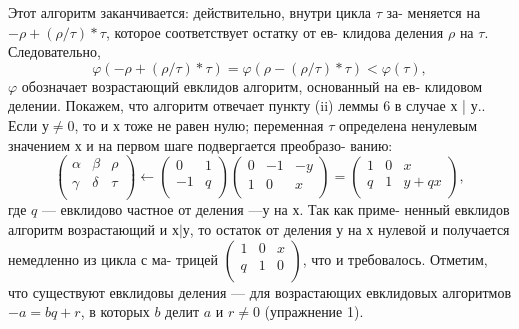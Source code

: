 \documentclass{mai_book}
\begin{document}
\begin{myproof}
Этот алгоритм заканчивается: действительно, внутри цикла $\tau$ за- \linebreak меняется на $ -\rho + (\rho / \tau) * \tau$, которое соответствует остатку от ев- \linebreak клидова деления $\rho$ на $\tau$. Следовательно, 
$$\varphi(-\rho + (\rho / \tau) * \tau) = \varphi (\rho - (\rho / \tau) * \tau) < \varphi(\tau),$$
$\varphi$ обозначает возрастающий евклидов алгоритм, основанный на ев- \linebreak клидовом делении.  
Покажем, что алгоритм отвечает пункту (ii) леммы 6 в случае х | у.. Если $у \ne 0$, то и $х$ тоже не равен нулю; переменная $\tau$ определена \linebreak ненулевым значением $х$ и на первом шаге подвергается преобразо- \linebreak ванию:  
$${\left( \begin{array}{ccc}
\alpha & \beta & \rho \\
\gamma & \delta & \tau \\
\end{array} \right)} \gets {\left( \begin{array}{ccc}
0 & 1 \\
-1 & q \\
\end{array} \right)} {\left( \begin{array}{ccc}
0 & -1 & -y \\
1 & 0 & x \\
\end{array} \right)} = {\left( \begin{array}{ccc}
1 & 0 & x \\
q & 1 & y+qx \\
\end{array} \right)},$$
где $q$ — евклидово частное от деления $—у$ на $х$. Так как приме- \linebreak ненный евклидов алгоритм возрастающий и $х | у$, то остаток от \linebreak деления $у$ на $х$ нулевой и получается немедленно из цикла с ма- \linebreak трицей ${\left( \begin{array}{ccc}
1 & 0 & x \\
q & 1 & 0 \\
\end{array} \right)}$, что и требовалось. Отметим, что существуют \linebreak
евклидовы деления --- для возрастающих евклидовых алгоритмов \linebreak  $- a = bq + r$, в которых $b$ делит $a$ и $r \ne 0$ (упражнение 1).  


\end{myproof}
\end{document}
